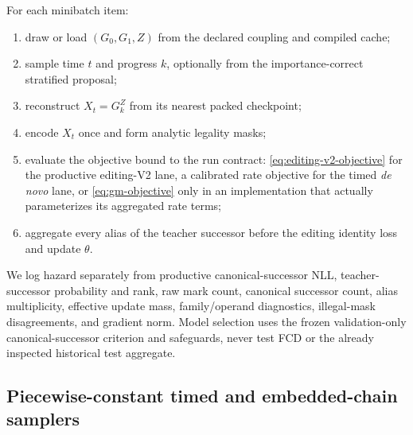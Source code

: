 \documentclass{article}
\theoremstyle{definition}
\theoremstyle{remark}
\begin{document}
For each minibatch item:
\begin{enumerate}[leftmargin=*]
    \item draw or load $(G_0,G_1,Z)$ from the declared coupling and compiled cache;
    \item sample time $t$ and progress $k$, optionally from the importance-correct stratified proposal;
    \item reconstruct $X_t=G_k^Z$ from its nearest packed checkpoint;
    \item encode $X_t$ once and form analytic legality masks;
    \item evaluate the objective bound to the run contract: \eqref{eq:editing-v2-objective} for the productive editing-V2 lane, a calibrated rate objective for the timed \emph{de novo} lane, or \eqref{eq:gm-objective} only in an implementation that actually parameterizes its aggregated rate terms;
    \item aggregate every alias of the teacher successor before the editing identity loss and update $\theta$.
\end{enumerate}
We log hazard separately from productive canonical-successor NLL, teacher-successor probability and rank, raw mark count, canonical successor count, alias multiplicity, effective update mass, family/operand diagnostics, illegal-mask disagreements, and gradient norm. Model selection uses the frozen validation-only canonical-successor criterion and safeguards, never test FCD or the already inspected historical test aggregate.

\subsection{Piecewise-constant timed and embedded-chain samplers}\label{app:sampler}
\end{document}
